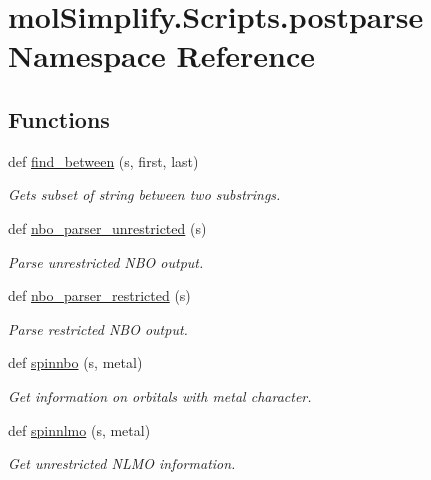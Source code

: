 \hypertarget{namespacemolSimplify_1_1Scripts_1_1postparse}{}\section{mol\+Simplify.\+Scripts.\+postparse Namespace Reference}
\label{namespacemolSimplify_1_1Scripts_1_1postparse}
\subsection*{Functions}
\begin{DoxyCompactItemize}
\item 
def \hyperlink{namespacemolSimplify_1_1Scripts_1_1postparse_a04fb9ea18ce31d7b1293555e11e45baa}{find\+\_\+between} (s, first, last)
\begin{DoxyCompactList}\small\item\em Gets subset of string between two substrings. \end{DoxyCompactList}\item 
def \hyperlink{namespacemolSimplify_1_1Scripts_1_1postparse_a8d5cc0fb78ca69556a0c1257b8529a23}{nbo\+\_\+parser\+\_\+unrestricted} (s)
\begin{DoxyCompactList}\small\item\em Parse unrestricted N\+BO output. \end{DoxyCompactList}\item 
def \hyperlink{namespacemolSimplify_1_1Scripts_1_1postparse_ade4a07685fb9e16d3d3ae139796e740f}{nbo\+\_\+parser\+\_\+restricted} (s)
\begin{DoxyCompactList}\small\item\em Parse restricted N\+BO output. \end{DoxyCompactList}\item 
def \hyperlink{namespacemolSimplify_1_1Scripts_1_1postparse_aa2a08eb5ade2736cf2d9dfadd5c777a3}{spinnbo} (s, metal)
\begin{DoxyCompactList}\small\item\em Get information on orbitals with metal character. \end{DoxyCompactList}\item 
def \hyperlink{namespacemolSimplify_1_1Scripts_1_1postparse_a4d3a6882f1fba50d3c119009732c95a9}{spinnlmo} (s, metal)
\begin{DoxyCompactList}\small\item\em Get unrestricted N\+L\+MO information. \end{DoxyCompactList}\item 

\end{DoxyCompactItemize}
